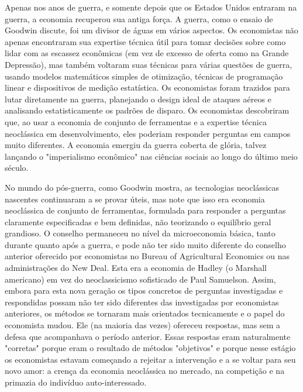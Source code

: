 \documentclass[12pt]{article}
\begin{document}
Apenas nos anos de guerra, e somente depois que os Estados Unidos entraram na guerra, a economia recuperou sua antiga força. A guerra, como o ensaio de Goodwin discute, foi um divisor de águas em vários aspectos. Os economistas não apenas encontraram sua expertise técnica útil para tomar decisões sobre como lidar com as escassez econômicas (em vez de excesso de oferta como na Grande Depressão), mas também voltaram suas técnicas para várias questões de guerra, usando modelos matemáticos simples de otimização, técnicas de programação linear e dispositivos de medição estatística. Os economistas foram trazidos para lutar diretamente na guerra, planejando o design ideal de ataques aéreos e analisando estatisticamente os padrões de disparo. Os economistas descobriram que, ao usar a economia de conjunto de ferramentas e a expertise técnica neoclássica em desenvolvimento, eles poderiam responder perguntas em campos muito diferentes. A economia emergiu da guerra coberta de glória, talvez lançando o "imperialismo econômico" nas ciências sociais ao longo do último meio século.

No mundo do pós-guerra, como Goodwin mostra, as tecnologias neoclássicas nascentes continuaram a se provar úteis, mas note que isso era economia neoclássica de conjunto de ferramentas, formulada para responder a perguntas claramente especificadas e bem definidas, não teorizando o equilíbrio geral grandioso. O conselho permaneceu no nível da microeconomia básica, tanto durante quanto após a guerra, e pode não ter sido muito diferente do conselho anterior oferecido por economistas no Bureau of Agricultural Economics ou nas administrações do New Deal. Esta era a economia de Hadley (o Marshall americano) em vez do neoclassicismo sofisticado de Paul Samuelson. Assim, embora para esta nova geração os tipos concretos de perguntas investigadas e respondidas possam não ter sido diferentes das investigadas por economistas anteriores, os métodos se tornaram mais orientados tecnicamente e o papel do economista mudou. Ele (na maioria das vezes) ofereceu respostas, mas sem a defesa que acompanhava o período anterior. Essas respostas eram naturalmente "corretas" porque eram o resultado de métodos "objetivos" e porque nesse estágio os economistas estavam começando a rejeitar a intervenção e a se voltar para seu novo amor: a crença da economia neoclássica no mercado, na competição e na primazia do indivíduo auto-interessado.
\end{document}
